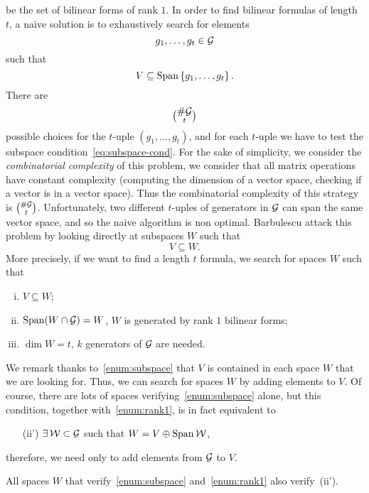 be the set of bilinear forms of rank $1$. In order to find bilinear formulas of
length $t$, a naive solution is to exhaustively search for elements 
\[
  g_1, \dots, g_t\in\mathcal{G}
\]
such that
\begin{equation}
  V\subseteq\operatorname{Span}\left\{ g_1, \dots, g_t \right\}.
  \label{eq:subspace-cond}
\end{equation}
There are
\[
  {\#\mathcal{G}}\choose{t}
\]
possible choices for the $t$-uple $(g_1, \dots, g_t)$, and for each $t$-uple we
have to test the subspace condition~\eqref{eq:subspace-cond}. For the sake of
simplicity, we consider the \emph{combinatorial complexity} of this problem, \ie
we consider that all matrix operations have constant complexity (\eg computing
the dimension of a vector space, checking if a vector is in a vector space).
Thus the combinatorial complexity of this strategy is ${\#\mathcal{G}}\choose{t}$.
Unfortunately, two different $t$-uples of generators in $\mathcal{G}$ can span the same
vector space, and so the naive algorithm is non optimal. Barbulescu \etal attack
this problem by looking directly at subspaces $W$ such that
\[
V\subseteq W.
\]
More precisely, if we want to find a length $t$ formula, we search for spaces $W$ such that
\begin{enumerate}[(i)]
  \item \label{enum:subspace} $V\subseteq W$;
  \item \label{enum:rank1} $\operatorname{Span}(W\cap\mathcal{G}) = W$, \ie $W$ is generated by rank $1$ bilinear forms;
  \item $\dim W = t$, \ie $k$ generators of $\mathcal{G}$ are needed.
\end{enumerate}
We remark thanks to~\ref{enum:subspace} that $V$ is contained in each space $W$
that we are looking for. Thus, we can search for spaces $W$ by adding elements
to $V$. Of course, there are lots of spaces verifying~\ref{enum:subspace}
alone, but this condition, together with~\ref{enum:rank1}, is in fact equivalent
to
\begin{enumerate}
  \item[(ii')] \label{enum:sum} $\exists\,\mathcal{W}\subset\mathcal{G}$ such that
    $W=V\oplus\operatorname{Span}\mathcal{W}$,
\end{enumerate}
therefore, we need only to add elements from $\mathcal{G}$ to $V$.
\begin{lm}
  \label{lm:cond-equiv}
  All spaces $W$ that verify~\ref{enum:subspace} and~\ref{enum:rank1} also
  verify~(ii').
\end{lm}
